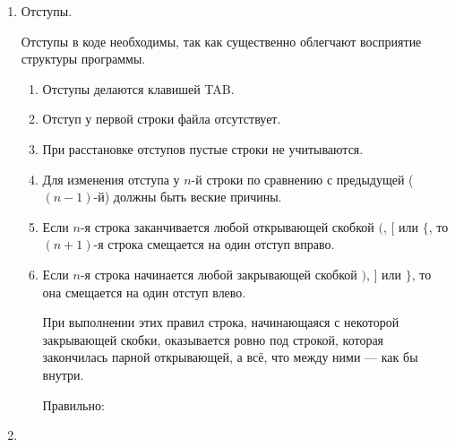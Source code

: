 \begin{enumerate}
	\item
		Отступы.

		Отступы в коде необходимы, так как существенно облегчают восприятие структуры программы.
		\begin{enumerate}
			\item
				Отступы делаются клавишей TAB.
			\item
				Отступ у первой строки файла отсутствует.
			\item
				При расстановке отступов пустые строки не учитываются.
			\item
				Для изменения отступа у $n$-й строки по сравнению с предыдущей ($(n-1)$-й) должны быть веские причины.
			\item
				Если $n$-я строка заканчивается любой открывающей скобкой $($, $[$ или $\{$,
				то $(n+1)$-я строка смещается на один отступ вправо.
			\item
				Если $n$-я строка начинается любой закрывающей скобкой $)$, $]$ или $\}$,
				то она смещается на один отступ влево.

				При выполнении этих правил строка, начинающаяся с некоторой закрывающей скобки, оказывается ровно под строкой,
				которая закончилась парной открывающей, а всё, что между ними --- как бы внутри.

				Правильно:
		\end{enumerate}
	\item
\end{enumerate}






